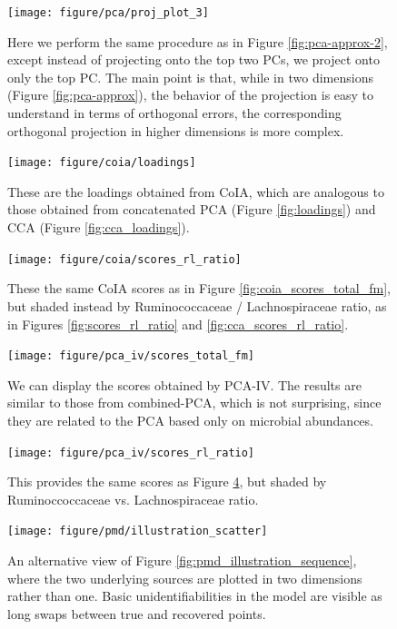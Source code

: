 \documentclass{article}
\begin{document}
\begin{figure}
  \texttt{[image: figure/pca/proj\_plot\_3]}
  \caption{Here we perform the same procedure as in Figure
    \ref{fig:pca-approx-2}, except instead of projecting onto the top two PCs,
    we project onto only the top PC. The main point is that, while in two
    dimensions (Figure \ref{fig:pca-approx}), the behavior of the projection is
    easy to understand in terms of orthogonal errors, the corresponding
    orthogonal projection in higher dimensions is more complex.
  \label{fig:pca-approx-3}}
\end{figure}

\begin{figure}[ht]
  \centering \texttt{[image: figure/coia/loadings]}
  \caption{These are the loadings obtained from CoIA, which are analogous to
    those obtained from concatenated PCA (Figure \ref{fig:loadings}) and CCA
    (Figure \ref{fig:cca_loadings}). \label{fig:coia_loadings} }
\end{figure}

\begin{figure}[ht]
  \centering
  \texttt{[image: figure/coia/scores\_rl\_ratio]}
  \caption{These the same CoIA scores as in Figure \ref{fig:coia_scores_total_fm},
    but shaded instead by Ruminococcaceae / Lachnospiraceae ratio, as in Figures
    \ref{fig:scores_rl_ratio} and
    \ref{fig:cca_scores_rl_ratio}. \label{fig:coia_scores_rl_ratio} }
\end{figure}

\begin{figure}[ht]
  \centering
  \texttt{[image: figure/pca\_iv/scores\_total\_fm]}
  \caption{We can display the scores obtained by PCA-IV. The results are similar
    to those from combined-PCA, which is not surprising, since they are related
    to the PCA based only on microbial
    abundances. \label{fig:pca_iv_scores_total_fm} }
\end{figure}

\begin{figure}[ht]
  \centering
  \texttt{[image: figure/pca\_iv/scores\_rl\_ratio]}
  \caption{This provides the same scores as Figure
    \ref{fig:pca_iv_scores_total_fm}, but shaded by Ruminoccoccaceae vs.
    Lachnospiraceae ratio. \label{fig:pca_iv_scores_rl_ratio} }
\end{figure}

\begin{figure}[ht]
  \centering
  \texttt{[image: figure/pmd/illustration\_scatter]}
  \caption{An alternative view of Figure \ref{fig:pmd_illustration_sequence},
    where the two underlying sources are plotted in two dimensions rather than
    one. Basic unidentifiabilities in the model are visible as long swaps
    between true and recovered points. \label{fig:pmd_illustration_scatter} }
\end{figure}
\end{document}
